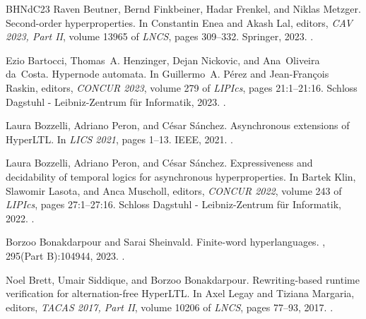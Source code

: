 \documentclass[dvipsnames,10pt,a4paper]{amsart}
\theoremstyle{definition}
\theoremstyle{remark}
\begin{document}
\begin{thebibliography}{BHNdC23}
Raven Beutner, Bernd Finkbeiner, Hadar Frenkel, and Niklas Metzger.
\newblock Second-order hyperproperties.
\newblock In Constantin Enea and Akash Lal, editors, {\em {CAV} 2023, Part {II}}, volume 13965 of {\em LNCS}, pages 309--332. Springer, 2023.
\newblock \href {https://doi.org/10.1007/978-3-031-37703-7\_15} {}.

Ezio Bartocci, Thomas~A. Henzinger, Dejan Nickovic, and Ana~Oliveira da~Costa.
\newblock Hypernode automata.
\newblock In Guillermo~A. P{\'{e}}rez and Jean{-}Fran{\c{c}}ois Raskin, editors, {\em CONCUR 2023}, volume 279 of {\em LIPIcs}, pages 21:1--21:16. Schloss Dagstuhl - Leibniz-Zentrum für Informatik, 2023.
\newblock \href {https://doi.org/10.4230/LIPICS.CONCUR.2023.21} {}.

Laura Bozzelli, Adriano Peron, and C{\'{e}}sar S{\'{a}}nchez.
\newblock Asynchronous extensions of {HyperLTL}.
\newblock In {\em {LICS} 2021}, pages 1--13. {IEEE}, 2021.
\newblock \href {https://doi.org/10.1109/LICS52264.2021.9470583} {}.

Laura Bozzelli, Adriano Peron, and C{\'{e}}sar S{\'{a}}nchez.
\newblock Expressiveness and decidability of temporal logics for asynchronous hyperproperties.
\newblock In Bartek Klin, Slawomir Lasota, and Anca Muscholl, editors, {\em {CONCUR} 2022}, volume 243 of {\em LIPIcs}, pages 27:1--27:16. Schloss Dagstuhl - Leibniz-Zentrum für Informatik, 2022.
\newblock \href {https://doi.org/10.4230/LIPIcs.CONCUR.2022.27} {}.

Borzoo Bonakdarpour and Sarai Sheinvald.
\newblock Finite-word hyperlanguages.
, 295(Part {B}):104944, 2023.
\newblock \href {https://doi.org/10.1016/J.IC.2022.104944} {}.

Noel Brett, Umair Siddique, and Borzoo Bonakdarpour.
\newblock Rewriting-based runtime verification for alternation-free {HyperLTL}.
\newblock In Axel Legay and Tiziana Margaria, editors, {\em {TACAS} 2017, Part {II}}, volume 10206 of {\em LNCS}, pages 77--93, 2017.
\newblock \href {https://doi.org/10.1007/978-3-662-54580-5\_5} {}.


\end{thebibliography}
\end{document}
